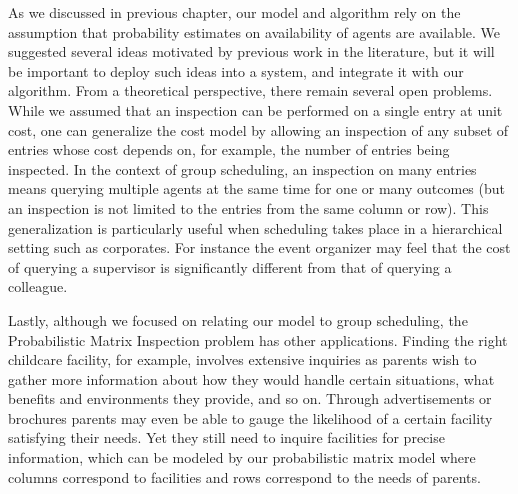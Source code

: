 As we discussed in previous chapter, our model and algorithm rely on the assumption that probability estimates on availability of agents are available. We suggested several ideas motivated by previous work in the literature, but it will be important to deploy such ideas into a system, and integrate it with our algorithm. From a theoretical perspective, there remain several open problems. While we assumed that an inspection can be performed on a single entry at unit cost, one can generalize the cost model by allowing an inspection of any subset of entries whose cost depends on, for example, the number of entries being inspected. In the context of group scheduling, an inspection on many entries means querying multiple agents at the same time for one or many outcomes (but an inspection is not limited to the entries from the same column or row). This generalization is particularly useful when scheduling takes place in a hierarchical setting such as corporates. For instance the event organizer may feel that the cost of querying a supervisor is significantly different from that of querying a colleague.

Lastly, although we focused on relating our model to group scheduling, the Probabilistic Matrix Inspection problem has other applications. Finding the right childcare facility, for example, involves extensive inquiries as parents wish to gather more information about how they would handle certain situations, what benefits and environments they provide, and so on. Through advertisements or brochures parents may even be able to gauge the likelihood of a certain facility satisfying their needs. Yet they still need to inquire facilities for precise information, which can be modeled by our probabilistic matrix model where columns correspond to facilities and rows correspond to the needs of parents. 

